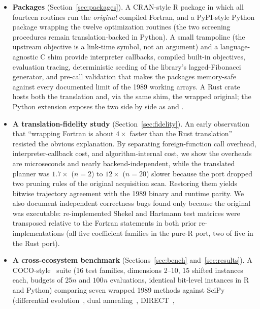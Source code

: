 \begin{itemize}
\item \textbf{Packages} (Section~\ref{sec:packages}). A CRAN-style R
  package in which all fourteen routines run the \emph{original}
  compiled Fortran, and a PyPI-style Python package wrapping the twelve
  optimization routines (the two screening procedures remain
  translation-backed in Python). A small trampoline (the upstream
  objective  is a link-time symbol, not an argument) and a
  language-agnostic C shim provide interpreter callbacks, compiled
  built-in objectives, evaluation tracing, deterministic seeding of the
  library's lagged-Fibonacci generator, and pre-call validation that makes
  the packages memory-safe against every documented limit of the 1989
  working arrays. A Rust crate hosts both the translation and, via the
  same shim, the wrapped original; the Python extension exposes the two
  side by side as  and .
\item \textbf{A translation-fidelity study}
  (Section~\ref{sec:fidelity}). An early observation that ``wrapping
  Fortran is about $4\times$ faster than the Rust translation'' resisted
  the obvious explanation. By separating foreign-function call overhead,
  interpreter-callback cost, and algorithm-internal cost, we show the
  overheads are microseconds and nearly backend-independent, while the
  translated  planner was $1.7\times$ ($n{=}2$) to
  $12\times$ ($n{=}20$) slower because the port dropped two pruning
  rules of the original acquisition scan. Restoring them yields bitwise
  trajectory agreement with the 1989 binary and runtime parity. We also
  document independent correctness bugs found only because the original
  was executable: re-implemented Shekel and Hartmann test matrices were
  transposed relative to the Fortran  statements in both
  prior re-implementations (all five coefficient families in the pure-R
  port, two of five in the Rust port).
\item \textbf{A cross-ecosystem benchmark} (Sections~\ref{sec:bench}
  and~\ref{sec:results}). A COCO-style~\cite{hansen2021coco} suite (16
  test families, dimensions 2--10, 15 shifted instances each, budgets of
  $25n$ and $100n$ evaluations, identical bit-level instances in R and
  Python) comparing seven wrapped 1989 methods against SciPy
  (differential evolution~\cite{storn1997differential}, dual
  annealing~\cite{tsallis1996generalized,xiang1997generalized},
  DIRECT~\cite{jones1993lipschitzian,gablonsky2001locally},

\end{itemize}
